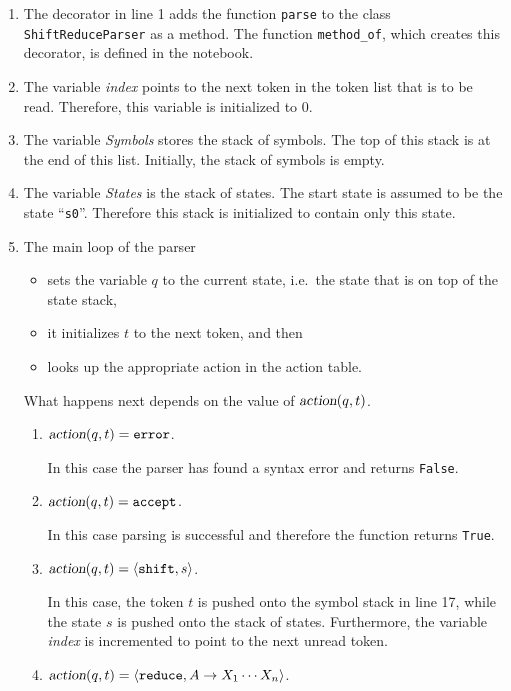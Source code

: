 \begin{enumerate}
\item The decorator in line 1 adds the function \texttt{parse} to the class \texttt{ShiftReduceParser} as a
      method.  The function \texttt{method\_of}, which creates this decorator, is defined in the notebook.
\item The variable \textsl{index} points to the next token in the token list that is to be
      read.  Therefore, this variable is initialized to 0.
\item The variable \textsl{Symbols} stores the stack of symbols.  The top of this stack is
      at the end of this list.  Initially, the stack of symbols is empty.
\item The variable \textsl{States} is the stack of states.  The start state is assumed to
      be the state ``\texttt{s0}''.  Therefore this stack is initialized to contain
      only this state.
\item The main loop of the parser 
      \begin{itemize}
      \item sets the variable $q$ to the current state, i.e.~the state that is on top of the state stack,
      \item it initializes $t$ to the next token, and then
      \item looks up the appropriate action in the action table.
      \end{itemize}
      What happens next depends on the value of $\textsl{action}(q, t)$.
      \begin{enumerate}
      \item $\textsl{action}(q,t) = \texttt{error}$.

            In this case the parser has found a syntax error and returns \texttt{False}.
      \item $\textsl{action}(q,t) = \texttt{accept}$.

            In this case parsing is successful and therefore the function returns \texttt{True}.
      \item $\textsl{action}(q,t) = \pair(\texttt{shift}, s)$.
        
            In this case, the token $t$ is pushed onto the symbol stack in line 17,
            while the state $s$ is pushed onto the stack of states.  Furthermore,
            the variable \textsl{index} is incremented to point to the next unread token.            
      \item $\textsl{action}(q,t) = \pair(\texttt{reduce}, A \rightarrow X_1 \cdots X_n)$.


\end{enumerate}
\end{enumerate}
